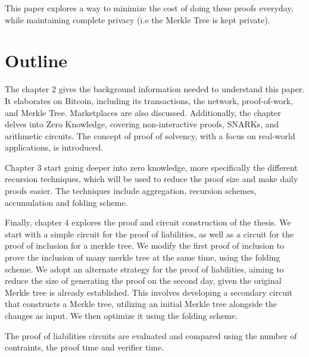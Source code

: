 This paper explores a way to minimize the cost of doing these proofs everyday, while maintaining complete privacy (i.e the Merkle Tree is kept private).


\section{Outline}

The chapter 2 gives the background information needed to understand this paper.
It elaborates on Bitcoin, including its transactions, the network, proof-of-work, and Merkle Tree. Marketplaces are also discussed. 
Additionally, the chapter delves into Zero Knowledge, covering non-interactive proofs, SNARKs, and arithmetic circuits.
The concept of proof of solvency, with a focus on real-world applications, is introduced. 

Chapter 3 start going deeper into zero knowledge, more specifically the different recursion techniques, which will be used to reduce the proof size and make 
daily proofs easier.
The techniques include aggregation, recursion schemes, accumulation and folding scheme.

Finally, chapter 4 explores the proof and circuit construction of the thesis.
We start with a simple circuit for the proof of liabilities, as well as a circuit for the proof of inclusion for a merkle tree.
We modify the first proof of inclusion to prove the inclusion of many merkle tree at the same time, using the folding scheme.
We adopt an alternate strategy for the proof of liabilities, aiming to reduce the size of generating the proof on the second day, 
given the original Merkle tree is already established. This involves developing a secondary circuit that constructs a Merkle tree, utilizing an initial Merkle tree alongside the changes as input.
We then optimize it using the folding scheme.

The proof of liabilities circuits are evaluated and compared using the number of contraints, the proof time and verifier time. 